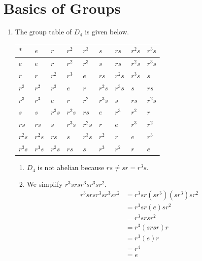 \section{Basics of Groups}
\begin{enumerate}
    \item The group table of $D_4$ is given below.
    \begin{table}[h]
        \centering
        \begin{tabular}{|l|l|l|l|l|l|l|l|l|}
        \hline
        $\ast$ & $e$    & $r$    & $r^2$  & $r^3$  & $s$    & $rs$   & $r^2s$ & $r^3s$ \\ \hline
        $e$    & $e$    & $r$    & $r^2$  & $r^3$  & $s$    & $rs$   & $r^2s$ & $r^3s$ \\ \hline
        $r$    & $r$    & $r^2$  & $r^3$  & $e$    & $rs$   & $r^2s$ & $r^3s$ & $s$    \\ \hline
        $r^2$  & $r^2$  & $r^3$  & $e$    & $r$    & $r^2s$ & $r^3s$ & $s$    & $rs$   \\ \hline
        $r^3$  & $r^3$  & $e$    & $r$    & $r^2$  & $r^3s$ & $s$    & $rs$   & $r^2s$ \\ \hline
        $s$    & $s$    & $r^3s$ & $r^2s$ & $rs$   & $e$    & $r^3$  & $r^2$  & $r$    \\ \hline
        $rs$   & $rs$   & $s$    & $r^3s$ & $r^2s$ & $r$    & $e$    & $r^3$  & $r^2$  \\ \hline
        $r^2s$ & $r^2s$ & $rs$   & $s$    & $r^3s$ & $r^2$  & $r$    & $e$    & $r^3$  \\ \hline
        $r^3s$ & $r^3s$ & $r^2s$ & $rs$   & $s$    & $r^3$  & $r^2$  & $r$    & $e$    \\ \hline
        \end{tabular}
    \end{table}
    \begin{enumerate}[label=(\alph*)]
        \item $D_4$ is not abelian because $rs \neq sr = r^3s$.
        \item We simplify $r^3srsr^3sr^3sr^2$.
        \begin{align*}
            r^3srsr^3sr^3sr^2 &= r^3sr(sr^3)(sr^3)sr^2\\
            &= r^3sr(e)sr^2\\
            &= r^3srsr^2\\
            &= r^3(srsr)r\\
            &= r^3(e)r\\
            &= r^4\\
            &= e
        \end{align*}
    \end{enumerate}


\end{enumerate}
